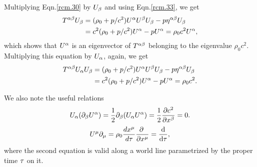 Multiplying Eqn.\eqref{rcm.30} by $U_{{\beta}}$ and using
Eqn.\eqref{rcm.33}, we get
\begin{align}\label{rcm.35}
T^{{\alpha}{\beta}}U_{{\beta}}
&=(\rho_0 +p/c^2) U^{{\alpha}} U^{{\beta}} U_{{\beta}} - p
\eta^{{\alpha}{\beta}} U_{{\beta}} \\
&=c^2(\rho_0 +p/c^2)U^{{\alpha}} -pU^{{\alpha}}=\rho_0c^2U^{{\alpha}},
\end{align}
which shows that $ U^{{\alpha}}$ is an eigenvector of 
$T^{{\alpha}{\beta}}$ belonging to the eigenvalue $\rho_0 c^2$. 
Multiplying this equation by $U_{{\alpha}}$, again, we get
\begin{align}\label{rcm.36}
T^{{\alpha}{\beta}}U_{{\alpha}} U_{{\beta}}
&=(\rho_0 +p/c^2) U^{{\alpha}} U^{{\beta}} U_{{\beta}} - p
\eta^{{\alpha}{\beta}} U_{{\beta}} \\
&=c^2(\rho_0 +p/c^2)U^{{\alpha}} -pU^{{\alpha}}=\rho_0c^2.
\end{align}

We also note the useful relations
\begin{align} \label{rcm.37}
U_{{\alpha}} ({\partial}_{{\beta}} U^{{\alpha}})
=\frac{1}{2}{\partial}_{{\beta}}(U_{{\alpha}} U^{{\alpha}})
=\frac{1}{2}\frac{{\partial} c^2}{{\partial} x^{{\beta}}}=0.
\end{align}
\begin{align} \label{rcm.38}
U^{{\mu}}{\partial}_{{\mu}}
=\rho_0 \frac{dx^{{\mu}}}{d{\tau}}
\frac{ {\partial} \;}{{\partial} x^{{\mu}}}
=\frac{ \mathrm{d} }{\mathrm{d} {\tau}},
\end{align}
where the second equation is valid along a world line
parametrized by the proper time ${\tau}$ on it.

